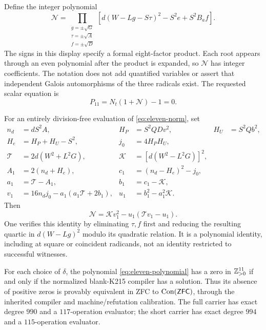 Define the integer polynomial
\begin{equation}\label{eq:eleven-norm}
 \mathcal N=
 \prod_{\substack{g=\pm\sqrt G\\ \tau=\pm\sqrt A\\ f=\pm\sqrt D}}
 \left[d(W-Lg-S\tau)^2-S^2e+S^2B_af\right].
\end{equation}
The signs in this display specify a formal eight-factor product. Each
root appears through an even polynomial after the product is expanded,
so $\mathcal N$ has integer coefficients. The notation does not add
quantified variables or assert that independent Galois automorphisms of
the three radicals exist. The requested scalar equation is
\begin{equation}\label{eq:eleven-polynomial}
 \boxed{\quad P_{11}=N_t(1+\mathcal N)-1=0.\quad}
\end{equation}

For an entirely division-free evaluation of \eqref{eq:eleven-norm}, set
\begin{align*}
 n_d&=dS^2A,&H_P&=S^2QDv^2,&H_U&=S^2Qb^2,\\
 H_e&=H_P+H_U-S^2,&j_0&=4H_PH_U,\\
 \mathcal T&=2d(W^2+L^2G),&\mathcal K&=[d(W^2-L^2G)]^2,\\
 A_1&=2(n_d+H_e),&c_1&=(n_d-H_e)^2-j_0,\\
 a_1&=\mathcal T-A_1,&b_1&=c_1-\mathcal K,\\
 v_1&=16n_dj_0-a_1(a_1\mathcal T+2b_1),&
 u_1&=b_1^2-a_1^2\mathcal K.
\end{align*}
Then
\begin{equation}\label{eq:eleven-scalar-norm}
 \mathcal N=\mathcal K v_1^2-u_1(\mathcal T v_1-u_1).
\end{equation}
One verifies this identity by eliminating $\tau,f$ first and reducing
the resulting quartic in $d(W-Lg)^2$ modulo its quadratic relation.
It is a polynomial identity, including at square or coincident
radicands, not an identity restricted to successful witnesses.

\begin{theorem}\label{thm:eleven}
For each choice of $\delta$, the polynomial
\eqref{eq:eleven-polynomial} has a zero in $\mathbb Z_{>0}^{11}$ if and only if
the normalized blank-K215 compiler has a solution. Thus its absence of
positive zeros is provably equivalent in ZFC to $\operatorname{Con}(\mathsf{ZFC})$, through
the inherited compiler and machine/refutation calibration.
The full carrier has exact degree $990$ and a $117$-operation evaluator;
the short carrier has exact degree $994$ and a $115$-operation evaluator.
\end{theorem}

